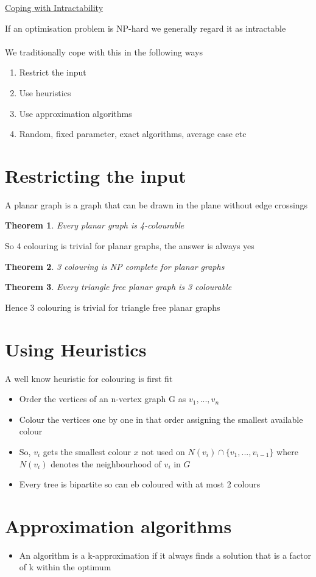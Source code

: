 \documentclass{article}[18pt]
\newtheorem{theorem}{Theorem}
\begin{document}
\begin{center}
\underline{\huge Coping with Intractability}
\end{center}
If an optimisation problem is NP-hard we generally regard it as intractable\\
\\
We traditionally cope with this in the following ways
\begin{enumerate}
	\item Restrict the input
	\item Use heuristics
	\item Use approximation algorithms
	\item Random, fixed parameter, exact algorithms, average case etc
\end{enumerate}
\section{Restricting the input}
A planar graph is a graph that can be drawn in the plane without edge crossings
\begin{theorem}
	Every planar graph is 4-colourable
\end{theorem}
So 4 colouring is trivial for planar graphs, the answer is always yes
\begin{theorem}
3 colouring is NP complete for planar graphs
\end{theorem}
\begin{theorem}
Every triangle free planar graph is 3 colourable
\end{theorem}
Hence 3 colouring is trivial for triangle free planar graphs
\section{Using Heuristics}
A well know heuristic for colouring is first fit
\begin{itemize}
	\item Order the vertices of an n-vertex graph G as $v_1,...,v_n$
	\item Colour the vertices one by one in that order assigning the smallest available colour
	\item So, $v_i$ gets the smallest colour $x$ not used on $N(v_i)\cap\{v_1,...,v_{i-1}\}$ where $N(v_i)$ denotes the neighbourhood of $v_i$ in $G$
	\item Every tree is bipartite so can eb coloured with at most 2 colours
\end{itemize}
\section{Approximation algorithms}
\begin{itemize}
	\item An algorithm is a k-approximation if it always finds a solution that is a factor of k within the optimum
\end{itemize}
\end{document}
